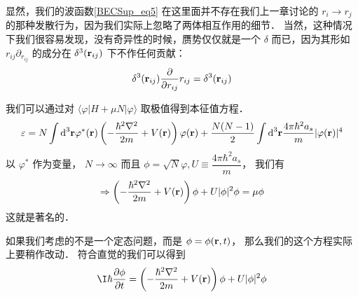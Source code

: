 显然，我们的波函数\autoref{BECSup_eq5} 在这里面并不存在我们上一章讨论的 $r_i\to r_j$ 的那种发散行为，因为我们实际上忽略了两体相互作用的细节． 当然，这种情况下我们很容易发现，没有奇异性的时候，赝势仅仅就是一个 $\delta$ 而已，因为其形如 $r_{ij}\partial_{r_{ij}}$ 的成分在 $\delta^3({\bf r}_{ij})$ 下不作任何贡献：
\begin{equation}
\delta^3({\bf r}_{ij})\frac{\partial}{\partial r_{ij}}r_{ij} = \delta^3({\bf r}_{ij})
\end{equation}

我们可以通过对 $\langle \varphi|H+\mu N|\varphi\rangle$ 取极值得到本征值方程．
\begin{equation}
\varepsilon = N\int \text{d}^3{\bf r}\varphi^*({\bf r})\left(-\frac{\hbar^2\nabla^2}{2m}+V({\bf r})\right)\varphi({\bf r})+\frac{N(N-1)}{2}\int \text{d}^3{\bf r}\frac{4\pi\hbar^2a_s}{m}|\varphi({\bf r})|^4
\end{equation}
以 $\varphi^*$ 作为变量， $N\to\infty$ 而且 $\phi = \sqrt{N}\varphi, U\equiv \dfrac{4\pi\hbar^2a_s}{m}$， 我们有
\begin{equation}
\Rightarrow \left(-\frac{\hbar^2\nabla^2}{2m}+V({\bf r})\right)\phi + U|\phi|^2\phi = \mu\phi
\end{equation}
这就是著名的．

如果我们考虑的不是一个定态问题，而是 $\phi = \phi({\bf r},t)$， 那么我们的这个方程实际上要稍作改动． 符合直觉的我们可以得到 
\begin{equation}\label{BECSup_eq10}
\I\hbar\frac{\partial\phi}{\partial t} = \left(-\frac{\hbar^2\nabla^2}{2m}+V({\bf r})\right)\phi + U|\phi|^2\phi
\end{equation}

